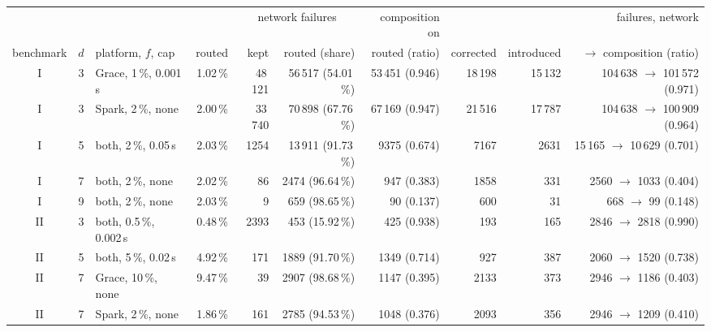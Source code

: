 \begin{tabular}{@{}cclrrrrrrr@{}}
\toprule
& & & & \multicolumn{2}{c}{network failures} & composition on & & & failures, network \\
\cmidrule(lr){5-6}
benchmark & $d$ & platform, $f$, cap & routed & kept & routed (share) & routed (ratio) & corrected & introduced & $\to$ composition (ratio) \\
\midrule
I & 3 & Grace, 1\,\%, 0.001\,s & 1.02\,\% & 48\,121 & 56\,517 (54.01\,\%) & 53\,451 (0.946) & 18\,198 & 15\,132 & 104\,638 $\to$ 101\,572 (0.971) \\
I & 3 & Spark, 2\,\%, none & 2.00\,\% & 33\,740 & 70\,898 (67.76\,\%) & 67\,169 (0.947) & 21\,516 & 17\,787 & 104\,638 $\to$ 100\,909 (0.964) \\
I & 5 & both, 2\,\%, 0.05\,s & 2.03\,\% & 1254 & 13\,911 (91.73\,\%) & 9375 (0.674) & 7167 & 2631 & 15\,165 $\to$ 10\,629 (0.701) \\
I & 7 & both, 2\,\%, none & 2.02\,\% & 86 & 2474 (96.64\,\%) & 947 (0.383) & 1858 & 331 & 2560 $\to$ 1033 (0.404) \\
I & 9 & both, 2\,\%, none & 2.03\,\% & 9 & 659 (98.65\,\%) & 90 (0.137) & 600 & 31 & 668 $\to$ 99 (0.148) \\
\midrule
II & 3 & both, 0.5\,\%, 0.002\,s & 0.48\,\% & 2393 & 453 (15.92\,\%) & 425 (0.938) & 193 & 165 & 2846 $\to$ 2818 (0.990) \\
II & 5 & both, 5\,\%, 0.02\,s & 4.92\,\% & 171 & 1889 (91.70\,\%) & 1349 (0.714) & 927 & 387 & 2060 $\to$ 1520 (0.738) \\
II & 7 & Grace, 10\,\%, none & 9.47\,\% & 39 & 2907 (98.68\,\%) & 1147 (0.395) & 2133 & 373 & 2946 $\to$ 1186 (0.403) \\
II & 7 & Spark, 2\,\%, none & 1.86\,\% & 161 & 2785 (94.53\,\%) & 1048 (0.376) & 2093 & 356 & 2946 $\to$ 1209 (0.410) \\
\bottomrule
\end{tabular}
